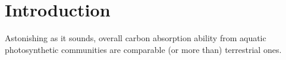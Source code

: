 \documentclass[../thesis.tex]{subfiles} %
\begin{document}
\section{Introduction}

Astonishing as it sounds, overall carbon absorption ability from aquatic photosynthetic communities are comparable (or more than) terrestrial ones.\autocite{SCHLESINGER2013341}
\end{document}
